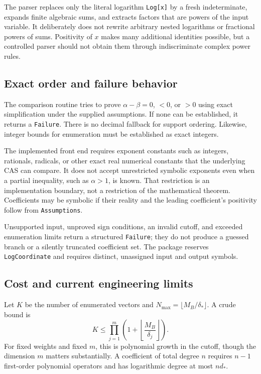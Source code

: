 \documentclass[11pt,a4paper]{article}
\numberwithin{equation}{section}
\theoremstyle{definition}
\newcommand{\code}[1]{\texttt{#1}}
\begin{document}
The parser replaces only the literal logarithm \code{Log[x]} by a fresh
indeterminate, expands finite algebraic sums, and extracts factors that
are powers of the input variable. It deliberately does not rewrite
arbitrary nested logarithms or fractional powers of sums. Positivity of
$x$ makes many additional identities possible, but a controlled parser
should not obtain them through indiscriminate complex power rules.

\subsection{Exact order and failure behavior}
The comparison routine tries to prove $\alpha-\beta=0$, $<0$, or $>0$
using exact simplification under the supplied assumptions. If none can
be established, it returns a \code{Failure}. There is no decimal fallback
for support ordering. Likewise, integer bounds for enumeration must be
established as exact integers.

The implemented front end requires exponent constants such as integers,
rationals, radicals, or other exact real numerical constants that the
underlying CAS can compare. It does not accept unrestricted symbolic
exponents even when a partial inequality, such as $\alpha>1$, is known.
That restriction is an implementation boundary, not a restriction of the
mathematical theorem. Coefficients may be symbolic if their reality and
the leading coefficient's positivity follow from \code{Assumptions}.

Unsupported input, unproved sign conditions, an invalid cutoff, and
exceeded enumeration limits return a structured \code{Failure}; they do
not produce a guessed branch or a silently truncated coefficient set.
The package reserves \code{LogCoordinate} and requires distinct,
unassigned input and output symbols.

\subsection{Cost and current engineering limits}
Let $K$ be the number of enumerated vectors and
$N_{\max}=\lfloor M_B/\delta_*\rfloor$. A crude bound is
\begin{equation}
 K\le\prod_{j=1}^m
     \left(1+\left\lfloor\frac{M_B}{\delta_j}\right\rfloor\right).
\end{equation}
For fixed weights and fixed $m$, this is polynomial growth in the cutoff,
though the dimension $m$ matters substantially. A coefficient of total
degree $n$ requires $n-1$ first-order polynomial operators and has
logarithmic degree at most $nd_*$.
\end{document}
